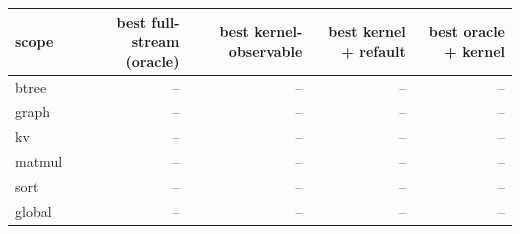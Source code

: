 \begin{tabular}{lrrrr}
\toprule
scope & best full-stream (oracle) & best kernel-observable & best kernel {+} refault & best oracle {+} kernel \\
\midrule
btree & -- & -- & -- & -- \\
graph & -- & -- & -- & -- \\
kv & -- & -- & -- & -- \\
matmul & -- & -- & -- & -- \\
sort & -- & -- & -- & -- \\
global & -- & -- & -- & -- \\
\bottomrule
\end{tabular}

